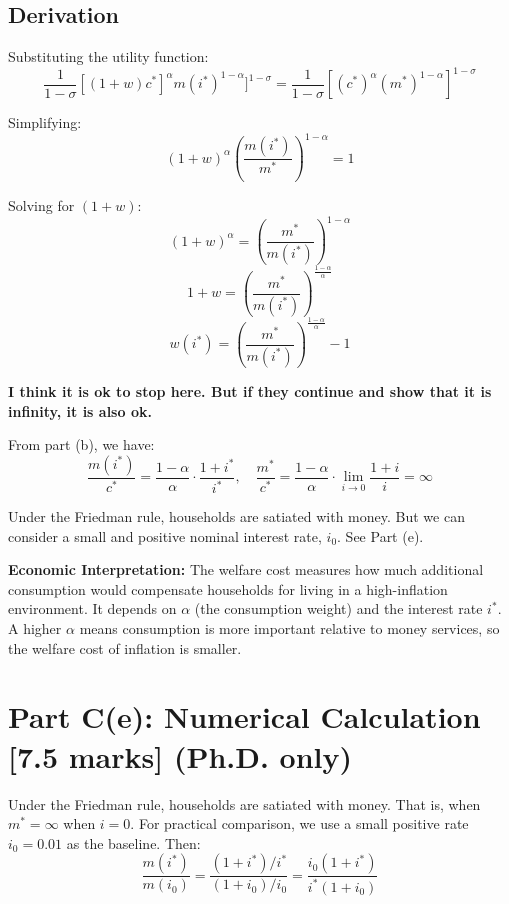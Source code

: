 \subsection*{Derivation}
Substituting the utility function:
\begin{equation}
\frac{1}{1-\sigma}[(1+w)c^*]^\alpha m(i^*)^{1-\alpha}]^{1-\sigma} = \frac{1}{1-\sigma}[(c^*)^\alpha (m^*)^{1-\alpha}]^{1-\sigma}
\end{equation}

Simplifying:
\begin{equation}
(1+w)^\alpha \left(\frac{m(i^*)}{m^*}\right)^{1-\alpha} = 1
\end{equation}


Solving for $(1+w)$:
\[
(1+w)^\alpha = \left(\frac{m^*}{m(i^*)}\right)^{1-\alpha}
\]
\[
1+w = \left(\frac{m^*}{m(i^*)}\right)^{\frac{1-\alpha}{\alpha}}
\]
\[
\boxed{w(i^*) = \left(\frac{m^*}{m(i^*)}\right)^{\frac{1-\alpha}{\alpha}} - 1}
\]

\textbf{I think it is ok to stop here. But if they continue and show that  it is infinity, it is also ok. }

From part (b), we have:
\begin{equation}
\frac{m(i^*)}{c^*} = \frac{1-\alpha}{\alpha} \cdot \frac{1+i^*}{i^*}, \quad \frac{m^*}{c^*} = \frac{1-\alpha}{\alpha} \cdot \lim_{i\to 0}\frac{1+i}{i} = \infty
\end{equation}

Under the Friedman rule, households are satiated with money. But we can consider a small and positive nominal interest rate, $i_0$. See Part (e). 


\textbf{Economic Interpretation:} The welfare cost measures how much additional consumption would compensate households for living in a high-inflation environment. It depends on $\alpha$ (the consumption weight) and the interest rate $i^*$. A higher $\alpha$ means consumption is more important relative to money services, so the welfare cost of inflation is smaller.

\section*{Part C(e): Numerical Calculation [7.5 marks] (Ph.D. only)}

Under the Friedman rule, households are satiated with money. That is, when $m^*=\infty$ when $i=0$.
For practical comparison, we use a small positive rate $i_0 = 0.01$ as the baseline. Then:
\begin{equation}
\frac{m(i^*)}{m(i_0)} = \frac{(1+i^*)/i^*}{(1+i_0)/i_0} = \frac{i_0(1+i^*)}{i^*(1+i_0)}
\end{equation}


